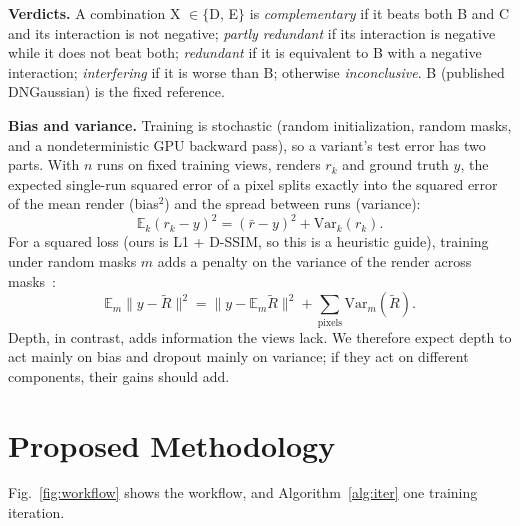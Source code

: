 \documentclass[conference]{IEEEtran}
\begin{document}
\textbf{Verdicts.} A combination X $\in\{$D, E$\}$ is \emph{complementary} if it beats both B and C and its interaction is not negative; \emph{partly redundant} if its interaction is negative while it does not beat both; \emph{redundant} if it is equivalent to B with a negative interaction; \emph{interfering} if it is worse than B; otherwise \emph{inconclusive}. B (published DNGaussian) is the fixed reference.

\textbf{Bias and variance.} Training is stochastic (random initialization, random masks, and a nondeterministic GPU backward pass), so a variant's test error has two parts. With $n$ runs on fixed training views, renders $r_k$ and ground truth $y$, the expected single-run squared error of a pixel splits exactly into the squared error of the mean render (bias$^2$) and the spread between runs (variance):
\begin{equation}
\mathbb{E}_k(r_k-y)^2=(\bar r-y)^2+\mathrm{Var}_k(r_k).
\label{eq:bv}
\end{equation}
For a squared loss (ours is L1 + D-SSIM, so this is a heuristic guide), training under random masks $m$ adds a penalty on the variance of the render across masks~\cite{wager2013dropout}:
\begin{equation}
\mathbb{E}_m\lVert y-\tilde R\rVert^2=\lVert y-\mathbb{E}_m\tilde R\rVert^2+\textstyle\sum_{\text{pixels}}\mathrm{Var}_m(\tilde R).
\label{eq:varpen}
\end{equation}
Depth, in contrast, adds information the views lack. We therefore expect depth to act mainly on bias and dropout mainly on variance; if they act on different components, their gains should add.

\section{Proposed Methodology}\label{sec:method}
Fig.~\ref{fig:workflow} shows the workflow, and Algorithm~\ref{alg:iter} one training iteration.
\end{document}

